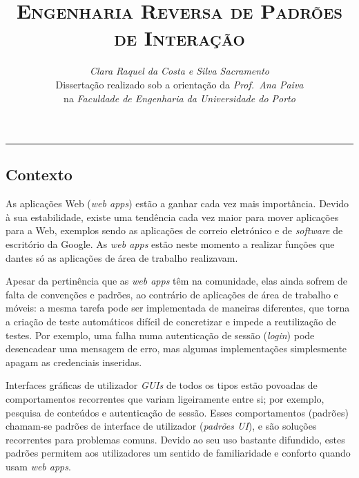 \documentclass[9pt,a4paper]{extarticle}
\begin{document}
\title{\vspace*{-8mm}\textbf{\textsc{Engenharia Reversa de Padrões de Interação}}}
\author{\emph{Clara Raquel da Costa e Silva Sacramento}\\[2mm]
\small{Dissertação realizado sob a orientação da \emph{Prof.\ Ana  Paiva}}\\
\small{na \emph{Faculdade de Engenharia da Universidade do Porto}}}
\date{}
\maketitle
\thispagestyle{empty}

\vspace*{-4mm}\noindent\rule{\textwidth}{0.4pt}\vspace*{4mm}

\begin{multicols}{2}
\section{Contexto}

As aplicações Web (\textit{web apps}) estão a ganhar cada vez mais importância. Devido à sua estabilidade, existe uma tendência cada vez maior para mover aplicações para a Web, exemplos sendo as aplicações de correio eletrónico e de \textit{software} de escritório da Google. As \textit{web apps} estão neste momento a realizar funções que dantes só as aplicações de área de trabalho realizavam. 

Apesar da pertinência que as \textit{web apps} têm na comunidade, elas ainda sofrem de falta de convenções e padrões, ao contrário de aplicações de área de trabalho e móveis: a mesma tarefa pode ser implementada de maneiras diferentes, que torna a criação de teste automáticos difícil de concretizar e impede a reutilização de testes. Por exemplo, uma falha numa autenticação de sessão (\textit{login}) pode desencadear uma mensagem de erro, mas algumas implementações simplesmente apagam as credenciais inseridas.

Interfaces gráficas de utilizador \textit{GUIs} de todos os tipos estão povoadas de comportamentos recorrentes que variam ligeiramente entre si; por exemplo, pesquisa de conteúdos e autenticação de sessão. Esses comportamentos (padrões) chamam-se padrões de interface de utilizador (\textit{padrões UI}), e são soluções recorrentes para problemas comuns. Devido ao seu uso bastante difundido, estes padrões permitem aos utilizadores um sentido de familiaridade e conforto quando usam \textit{web apps}. 


\end{multicols}
\end{document}
